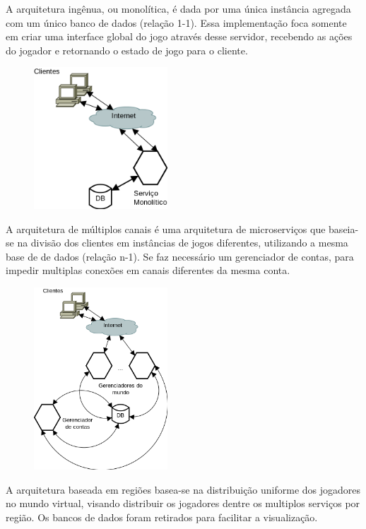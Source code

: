 A arquitetura ingênua, ou monolítica, é dada por uma única instância agregada com um único banco de dados (relação 1-1). Essa implementação foca somente em criar uma interface global do jogo através desse servidor, recebendo as ações do jogador e retornando o estado de jogo para o cliente.

\begin{figure}[H]
  \includegraphics[width=5cm]{arquiteturas/monolitica.png}
  \centering
\end{figure}

A arquitetura de múltiplos canais\cite{1417630} é uma arquitetura de microserviços que baseia-se na divisão dos clientes em instâncias de jogos diferentes, utilizando a mesma base de de dados (relação n-1). Se faz necessário um gerenciador de contas, para impedir multiplas conexões em canais diferentes da mesma conta.

\begin{figure}[H]
  \includegraphics[width=5cm]{arquiteturas/multiplos_canais.png}
  \centering
\end{figure}

A arquitetura baseada em regiões\cite{albion_online_unite} basea-se na distribuição uniforme dos jogadores no mundo virtual, visando distribuir os jogadores dentre os multiplos serviços por região. Os bancos de dados foram retirados para facilitar a visualização.

